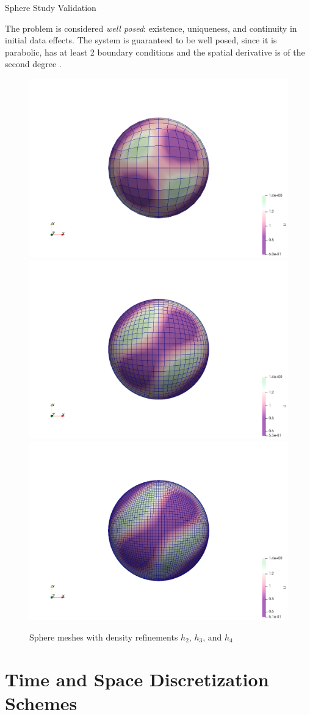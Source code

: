 \documentclass{beamer}
\begin{document}
		\begin{frame}{Sphere Study Validation}
		
		The problem is considered \textit{well posed}: existence, uniqueness, and continuity in initial data effects. The system is guaranteed to be well posed, since it is parabolic, has at least 2 boundary conditions and the spatial derivative is of the second degree \cite{Arnold2015}.
		
		\begin{figure}[H]\label{fig:mesh density}
			\includegraphics[width=.325\linewidth, trim= 10cm 5cm 10cm 5cm, clip]{images/ref2.png}
			\includegraphics[width=.325\linewidth, trim= 10cm 5cm 10cm 5cm, clip]{images/ref3.png}
			\includegraphics[width=.325\linewidth, trim= 10cm 5cm 10cm 5cm, clip]{images/ref4.png}
			\caption{Sphere meshes with density refinements $h_2$, $h_3$, and $h_4$}\label{fig:mesh_density}
		\end{figure}
		
		\end{frame}
    
    \section[FEM-IMEX]{Time and Space Discretization Schemes}
            
\end{document}
